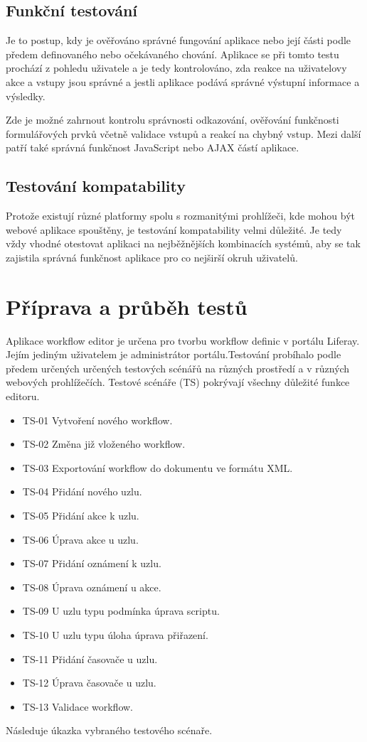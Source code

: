 \documentclass{fithesis}
\begin{document}
\subsection{Funkční testování}
Je to postup, kdy je ověřováno správné fungování aplikace nebo její části podle předem definovaného nebo očekávaného chování. Aplikace se při tomto testu prochází z pohledu uživatele a je tedy kontrolováno, zda reakce na uživatelovy akce a vstupy jsou správné a jestli aplikace podává správné výstupní informace a výsledky.

Zde je možné zahrnout kontrolu správnosti odkazování, ověřování funkčnosti formulářových prvků včetně validace vstupů a reakcí na chybný vstup. Mezi další patří také správná funkčnost JavaScript nebo AJAX částí aplikace.

\subsection{Testování kompatability}
Protože existují různé platformy spolu s rozmanitými prohlížeči, kde mohou být webové aplikace spouštěny, je testování kompatability velmi důležité. Je tedy vždy vhodné otestovat aplikaci na nejběžnějších kombinacích systémů, aby se tak zajistila správná funkčnost aplikace pro co nejširší okruh uživatelů.

\section{Příprava a průběh testů}
Aplikace workflow editor je určena pro tvorbu workflow definic v portálu Liferay. Jejím jediným uživatelem je administrátor portálu.Testování probíhalo podle předem určených určených testových scénářů na různých prostředí a v různých webových prohlížečích. Testové scénáře (TS) pokrývají všechny důležité funkce editoru. 
\begin{itemize}
\item TS-01 Vytvoření nového workflow.
\item TS-02 Změna již vloženého workflow.
\item TS-03 Exportování workflow do dokumentu ve formátu XML.
\item TS-04 Přidání nového uzlu.
\item TS-05 Přidání akce k uzlu.
\item TS-06 Úprava akce u uzlu.
\item TS-07 Přidání oznámení k uzlu.
\item TS-08 Úprava oznámení u akce.
\item TS-09 U uzlu typu podmínka úprava scriptu.
\item TS-10 U uzlu typu úloha úprava přiřazení.
\item TS-11 Přidání časovače u uzlu.
\item TS-12 Úprava časovače u uzlu.
\item TS-13 Validace workflow.
\end{itemize}
Následuje úkazka vybraného testového scénaře.
\end{document}
